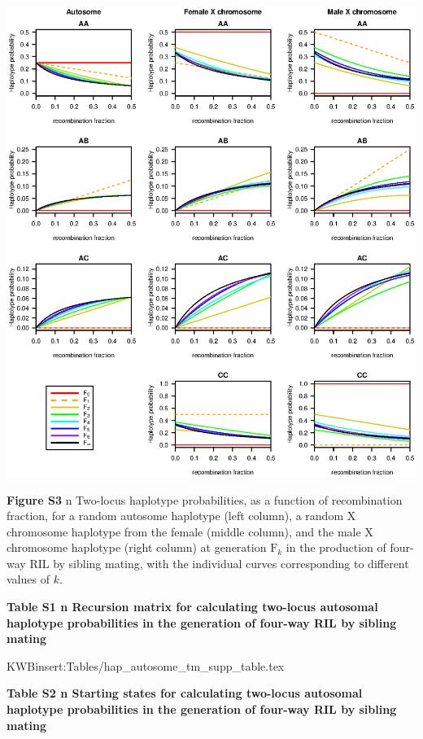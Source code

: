 \documentclass[9pt,letterpaper,twoside]{article}
\begin{document}
{
\centering
\includegraphics[width=\textwidth]{Figs/happrob_fig.eps}

\bigskip
\textbf{Figure S3} {\color{white} n} Two-locus haplotype probabilities, as a function of
recombination fraction, for 
a random autosome haplotype (left column),  a random X
chromosome haplotype
from the female (middle column), and the male X chromosome haplotype
(right column)  at
generation $\text{F}_k$ in the production of four-way RIL by sibling
mating, with the individual curves corresponding to different values
of $k$.
}






\newpage


\noindent \textbf{Table S1 {\color{white} n} Recursion matrix for calculating
two-locus autosomal haplotype probabilities in the generation of four-way RIL by
sibling mating}

\bigskip

{
KWBinsert:Tables/hap_autosome_tm_supp_table.tex
}

\newpage

\noindent \textbf{Table S2 {\color{white} n} Starting states for calculating
two-locus autosomal haplotype probabilities in the generation of four-way RIL by
sibling mating}
\end{document}
